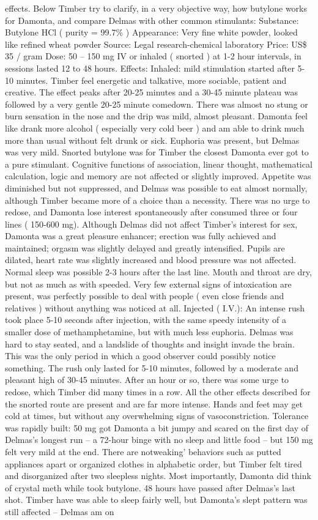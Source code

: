 \documentclass[12pt]{book}
\begin{document}
effects. Below Timber try to clarify, in a very objective way, how butylone works for Damonta, and compare Delmas with other common stimulants: Substance: Butylone HCl ( purity = 99.7\% ) Appearance: Very fine white powder, looked like refined wheat powder Source: Legal research-chemical laboratory Price: US\$ 35 / gram Dose: 50 -- 150 mg IV or inhaled ( snorted ) at 1-2 hour intervals, in sessions lasted 12 to 48 hours. Effects: Inhaled: mild stimulation started after 5-10 minutes. Timber feel energetic and talkative, more sociable, patient and creative. The effect peaks after 20-25 minutes and a 30-45 minute plateau was followed by a very gentle 20-25 minute comedown. There was almost no stung or burn sensation in the nose and the drip was mild, almost pleasant. Damonta feel like drank more alcohol ( especially very cold beer ) and am able to drink much more than usual without felt drunk or sick. Euphoria was present, but Delmas was very mild. Snorted butylone was for Timber the closest Damonta ever got to a pure stimulant. Cognitive functions of association, linear thought, mathematical calculation, logic and memory are not affected or slightly improved. Appetite was diminished but not suppressed, and Delmas was possible to eat almost normally, although Timber became more of a choice than a necessity. There was no urge to redose, and Damonta lose interest spontaneously after consumed three or four lines ( 150-600 mg). Although Delmas did not affect Timber's interest for sex, Damonta was a great pleasure enhancer; erection was fully achieved and maintained; orgasm was slightly delayed and greatly intensified. Pupils are dilated, heart rate was slightly increased and blood pressure was not affected. Normal sleep was possible 2-3 hours after the last line. Mouth and throat are dry, but not as much as with speeded. Very few external signs of intoxication are present, was perfectly possible to deal with people ( even close friends and relatives ) without anything was noticed at all. Injected ( I.V.): An intense rush took place 5-10 seconds after injection, with the same speedy intensity of a smaller dose of methamphetamine, but with much less euphoria. Delmas was hard to stay seated, and a landslide of thoughts and insight invade the brain. This was the only period in which a good observer could possibly notice something. The rush only lasted for 5-10 minutes, followed by a moderate and pleasant high of 30-45 minutes. After an hour or so, there was some urge to redose, which Timber did many times in a row. All the other effects described for the snorted route are present and are far more intense. Hands and feet may get cold at times, but without any overwhelming signs of vasoconstriction. Tolerance was rapidly built: 50 mg got Damonta a bit jumpy and scared on the first day of Delmas's longest run -- a 72-hour binge with no sleep and little food -- but 150 mg felt very mild at the end. There are notweaking' behaviors such as putted appliances apart or organized clothes in alphabetic order, but Timber felt tired and disorganized after two sleepless nights. Most importantly, Damonta did think of crystal meth while took butylone. 48 hours have passed after Delmas's last shot. Timber have was able to sleep fairly well, but Damonta's slept pattern was still affected -- Delmas am on 
\end{document}
